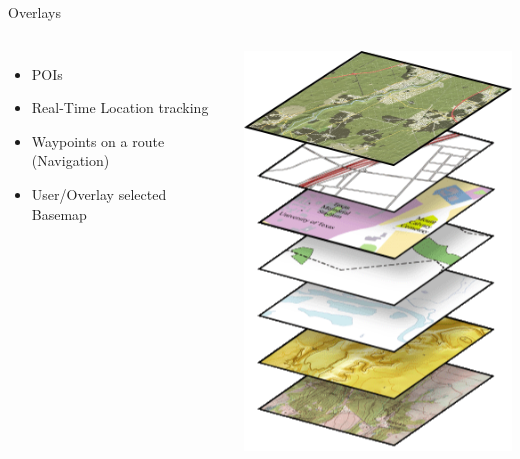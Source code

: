 \documentclass{beamer}
\begin{document}
\begin{frame}{Overlays}
 \begin{columns}
   \begin{itemize}
    \item POIs
    \item Real-Time Location tracking
    \item Waypoints on a route (Navigation)
    \item User/Overlay selected Basemap
   \end{itemize}
   \includegraphics[scale=0.5]{images/basemap_layers}
 \end{columns}
\end{frame}
\end{document}
